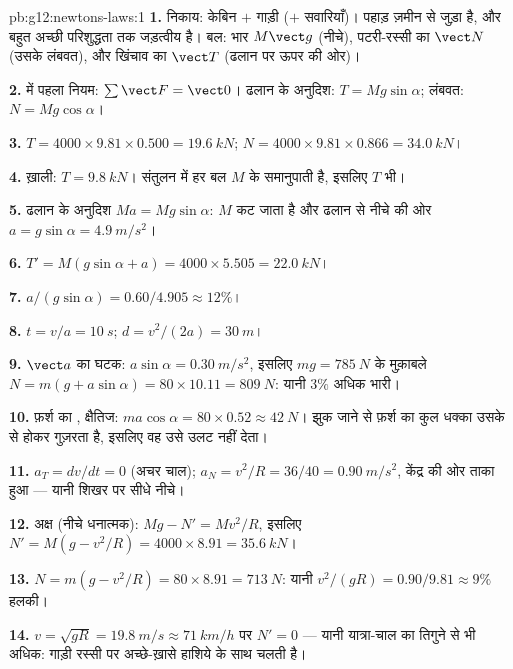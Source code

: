 \begin{solution}{pb:g12:newtons-laws:1}
\textbf{1.} निकाय: केबिन $+$ गाड़ी ($+$ सवारियाँ)। पहाड़ ज़मीन से जुड़ा
है, और बहुत अच्छी परिशुद्धता तक जड़त्वीय है। बल: भार $M\vect g$
(नीचे), पटरी-रस्सी का  $\vect N$ (उसके लंबवत), और खिंचाव का
 $\vect T$ (ढलान पर ऊपर की ओर)।

\textbf{2.}  में पहला नियम: $\sum \vect F = \vect 0$। ढलान के अनुदिश: $T = Mg\sin\alpha$; लंबवत:
$N = Mg\cos\alpha$।

\textbf{3.} $T = 4000 \times 9.81 \times 0.500 = \qty{19.6}{kN}$; $N = 4000 \times 9.81 \times 0.866 = \qty{34.0}{kN}$।

\textbf{4.} ख़ाली: $T = \qty{9.8}{kN}$। संतुलन में हर बल $M$ के समानुपाती है,
इसलिए $T$ भी।

\textbf{5.} ढलान के अनुदिश $Ma = Mg\sin\alpha$: $M$ कट जाता है और ढलान से नीचे की ओर
$a = g\sin\alpha = \qty{4.9}{m/s^2}$।

\textbf{6.} $T' = M(g\sin\alpha + a) = 4000 \times 5.505 =
\qty{22.0}{kN}$।

\textbf{7.} $a/(g\sin\alpha) = 0.60/4.905 \approx 12\%$।

\textbf{8.} $t = v/a = \qty{10}{s}$; $d = v^2/(2a) = \qty{30}{m}$।

\textbf{9.} $\vect a$ का  घटक: $a\sin\alpha =
\qty{0.30}{m/s^2}$, इसलिए $mg = \qty{785}{N}$ के मुक़ाबले
$N = m(g + a\sin\alpha) = 80 \times 10.11 =
\qty{809}{N}$: यानी $3\%$ अधिक भारी।

\textbf{10.} फ़र्श का , क्षैतिज: $ma\cos\alpha = 80 \times 0.52 \approx \qty{42}{N}$। झुक जाने से
फ़र्श का कुल धक्का उसके  से होकर गुज़रता है, इसलिए वह
उसे उलट नहीं देता।

\textbf{11.} $a_T = dv/dt = 0$ (अचर चाल); $a_N = v^2/R = 36/40 = \qty{0.90}{m/s^2}$, केंद्र की ओर ताका हुआ --- यानी शिखर
पर सीधे नीचे।

\textbf{12.}  अक्ष (नीचे धनात्मक): $Mg - N' = Mv^2/R$, इसलिए $N' = M(g - v^2/R) = 4000 \times 8.91 = \qty{35.6}{kN}$।

\textbf{13.} $N = m(g - v^2/R) = 80 \times 8.91 = \qty{713}{N}$: यानी $v^2/(gR) = 0.90/9.81 \approx 9\%$ हलकी।

\textbf{14.} $v = \sqrt{gR} = \qty{19.8}{m/s} \approx
\qty{71}{km/h}$ पर $N' = 0$ --- यानी यात्रा-चाल का तिगुने से भी अधिक:
गाड़ी रस्सी पर अच्छे-ख़ासे हाशिये के साथ चलती है।


\end{solution}
